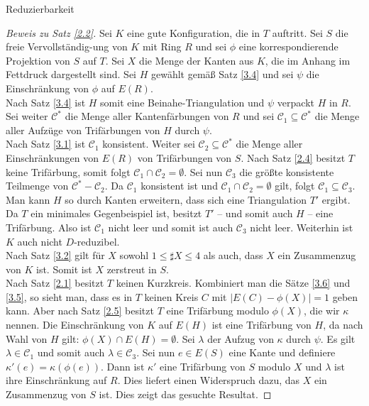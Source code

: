 \begin{section}{Reduzierbarkeit}
 \begin{proof}[Beweis zu Satz \ref{2.2}]
  Sei $K$ eine gute Konfiguration, die in $T$ auftritt. Sei $S$ die freie Vervollständig-ung von $K$ mit Ring $R$ und sei $\phi$ eine korrespondierende Projektion von $S$ auf $T$. Sei $X$ die Menge der Kanten aus $K$, die im Anhang im Fettdruck dargestellt sind. Sei $H$ gewählt gemäß Satz \ref{3.4} und sei $\psi$ die Einschränkung von $\phi$ auf $E(R)$.\\
  Nach Satz \ref{3.4} ist $H$ somit eine Beinahe-Triangulation und $\psi$ verpackt $H$ in $R$. Sei weiter $\mathscr{C}^*$ die Menge aller Kantenfärbungen von $R$ und sei $\mathscr{C}_1 \subseteq \mathscr{C}^*$ die Menge aller Aufzüge von Trifärbungen von $H$ durch $\psi$.\\
  Nach Satz \ref{3.1} ist $\mathscr{C}_1$ konsistent. Weiter sei $\mathscr{C}_2 \subseteq \mathscr{C}^*$ die Menge aller Einschränkungen von $E(R)$ von Trifärbungen von $S$. Nach Satz \ref{2.4} besitzt $T$ keine Trifärbung, somit folgt $\mathscr{C}_1 \cap \mathscr{C}_2 = \emptyset$. Sei nun $\mathscr{C}_3$ die größte konsistente Teilmenge von $\mathscr{C}^* - \mathscr{C}_2$. Da $\mathscr{C}_1$ konsistent ist und $\mathscr{C}_1 \cap \mathscr{C}_2 = \emptyset$ gilt, folgt $\mathscr{C}_1 \subseteq \mathscr{C}_3$.\\
  Man kann $H$ so durch Kanten erweitern, dass sich eine Triangulation $T'$ ergibt. Da $T$ ein minimales Gegenbeispiel ist, besitzt $T'$ -- und somit auch $H$ -- eine Trifärbung. Also ist $\mathscr{C}_1$ nicht leer und somit ist auch $\mathscr{C}_3$ nicht leer. Weiterhin ist $K$ auch nicht $D$-reduzibel.\\
  Nach Satz \ref{3.2} gilt für $X$ sowohl $1 \leq \sharp X \leq 4$ als auch, dass $X$ ein Zusammenzug von $K$ ist. Somit ist $X$ zerstreut in $S$. \\
  Nach Satz \ref{2.1} besitzt $T$ keinen Kurzkreis. Kombiniert man die Sätze \ref{3.6} und \ref{3.5}, so sieht man, dass es in $T$ keinen Kreis $C$ mit $|E(C) - \phi(X)| = 1$ geben kann. Aber nach Satz \ref{2.5} besitzt $T$ eine Trifärbung modulo $\phi(X)$, die wir $\kappa$ nennen. Die Einschränkung von $K$ auf $E(H)$ ist eine Trifärbung von $H$, da nach Wahl von $H$ gilt: $\phi(X) \cap E(H) = \emptyset$. Sei $\lambda$ der Aufzug von $\kappa$ durch $\psi$. Es gilt $\lambda \in \mathscr{C}_1$ und somit auch  $\lambda \in \mathscr{C}_3$. Sei nun $e \in E(S)$ eine Kante und definiere $\kappa'(e) = \kappa(\phi(e))$. Dann ist $\kappa'$ eine Trifärbung von $S$ modulo $X$ und $\lambda$ ist ihre Einschränkung auf $R$. Dies liefert einen Widerspruch dazu, das $X$ ein Zusammenzug von $S$ ist. Dies zeigt das gesuchte Resultat.
 \end{proof}
\end{section}